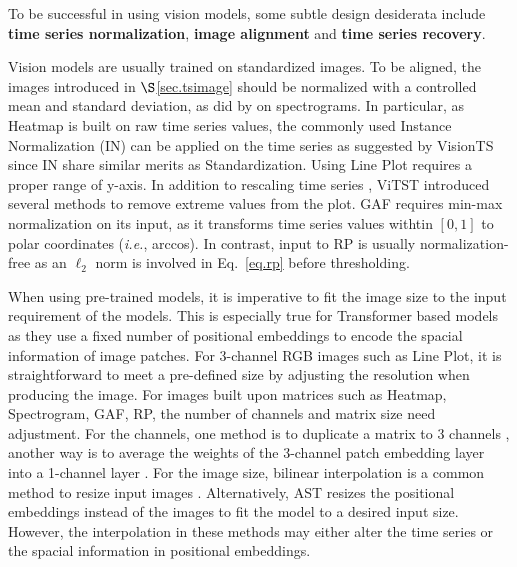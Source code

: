 To be successful in using vision models, some subtle design desiderata %
include {\bf time series normalization}, {\bf image alignment} and {\bf time series recovery}.

\vspace{0.2cm}

 Vision models are usually trained on %
standardized images. To be aligned, the images introduced in $\S$\ref{sec.tsimage} should be normalized with a controlled mean and standard deviation, as did by \cite{gong2021ast} on spectrograms. In particular, as Heatmap is built on raw time series values, the commonly used Instance Normalization (IN) \cite{kim2022reversible} can be applied on the time series as suggested by VisionTS \cite{chen2024visionts} since IN share similar merits as Standardization. %
Using Line Plot requires a proper range of y-axis. In addition to rescaling time series %
\cite{zhuang2024see}, ViTST \cite{li2023time} introduced several methods to remove extreme values from the plot. GAF requires min-max normalization on its input, as it transforms time series values withtin $[0, 1]$ to polar coordinates ({\em i.e.}, arccos). In contrast, input to RP is usually normalization-free as an $\ell_{2}$ norm is involved in Eq.~\eqref{eq.rp} before thresholding.%

\vspace{0.2cm}

 When using pre-trained models, it is imperative to fit the image size to the input requirement of the models. This is especially true for Transformer based models as they use a fixed number of positional embeddings to encode the spacial information of image patches. For 3-channel RGB images such as Line Plot, it is straightforward to meet a pre-defined size by adjusting the resolution when producing the image. For images built upon matrices such as Heatmap, Spectrogram, GAF, RP, the number of channels and matrix size need adjustment. For the channels, one method is to duplicate a matrix to 3 channels \cite{chen2024visionts}, another way is to average the weights of the 3-channel patch embedding layer into a 1-channel layer \cite{gong2021ast}. For the image size, bilinear interpolation is a common method to resize input images \cite{chen2024visionts}. Alternatively, AST \cite{gong2021ast} %
resizes the positional embeddings instead of the images to fit the model to a desired input size. However, the interpolation in these methods may either alter the time series or the spacial information in positional embeddings.

